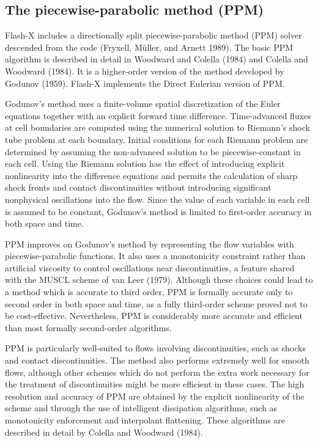 \subsection{The piecewise-parabolic method (PPM)}
\label{Sec:PPM}
\label{Sec:PPM algorithm}



Flash-X includes a directionally split piecewise-parabolic method (PPM)
solver descended from the  code (Fryxell, M\"uller, and
Arnett 1989).  The basic PPM algorithm is described in detail in
Woodward and Colella (1984) and Colella and Woodward (1984).  It is a
higher-order version of the method developed by Godunov (1959).  Flash-X
implements the Direct Eulerian version of PPM.

Godunov's method uses a finite-volume spatial discretization of the
Euler equations together with an explicit forward time difference.
Time-advanced fluxes at cell boundaries are computed using the
numerical solution to Riemann's shock tube problem at each
boundary. Initial conditions for each Riemann problem are determined
by assuming the non-advanced solution to be piecewise-constant in each
cell.  Using the Riemann solution has the effect of introducing
explicit nonlinearity into the difference equations and permits the
calculation of sharp shock fronts and contact discontinuities without
introducing significant nonphysical oscillations into the flow.  Since
the value of each variable in each cell is assumed to be constant,
Godunov's method is limited to first-order accuracy in both space and
time.

PPM improves on Godunov's method by representing the flow variables
with piecewise-parabolic functions. It also uses a monotonicity
constraint rather than artificial viscosity to control oscillations
near discontinuities, a feature shared with the MUSCL scheme of van
Leer (1979).  Although these choices could lead to a method which is accurate
to third order, PPM is formally accurate only to second order in both
space and time, as a fully third-order scheme proved not to be
cost-effective.  Nevertheless, PPM is considerably more accurate and
efficient than most formally second-order algorithms.

PPM is particularly well-suited to flows involving discontinuities,
such as shocks and contact discontinuities.  The method also performs
extremely well for smooth flows, although other schemes which do not
perform the extra work necessary for the treatment of discontinuities
might be more efficient in these cases.  The high resolution and
accuracy of PPM are obtained by the explicit nonlinearity of the
scheme and through the use of intelligent dissipation algorithms, such
as monotonicity enforcement and interpolant
flattening. These algorithms are described in detail by Colella and
Woodward (1984).

